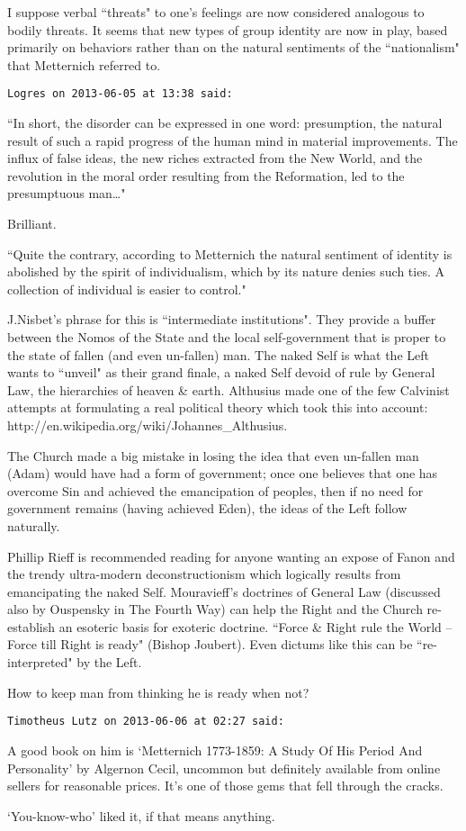 \begin{footnotesize}
\begin{sffamily}
I suppose verbal ``threats" to one's feelings are now considered analogous to bodily threats. It seems that new types of group identity are now in play, based primarily on behaviors rather than on the natural sentiments of the ``nationalism" that Metternich referred to.


\hfill

\texttt{Logres on 2013-06-05 at 13:38 said: }

``In short, the disorder can be expressed in one word: presumption, the natural result of such a rapid progress of the human mind in material improvements. The influx of false ideas, the new riches extracted from the New World, and the revolution in the moral order resulting from the Reformation, led to the presumptuous man…"

Brilliant. 

``Quite the contrary, according to Metternich the natural sentiment of identity is abolished by the spirit of individualism, which by its nature denies such ties. A collection of individual is easier to control."

J.Nisbet's phrase for this is ``intermediate institutions". They provide a buffer between the Nomos of the State and the local self-government that is proper to the state of fallen (and even un-fallen) man. The naked Self is what the Left wants to ``unveil" as their grand finale, a naked Self devoid of rule by General Law, the hierarchies of heaven \& earth. Althusius made one of the few Calvinist attempts at formulating a real political theory which took this into account: http://en.wikipedia.org/wiki/Johannes\_Althusius.

The Church made a big mistake in losing the idea that even un-fallen man (Adam) would have had a form of government; once one believes that one has overcome Sin and achieved the emancipation of peoples, then if no need for government remains (having achieved Eden), the ideas of the Left follow naturally. 

Phillip Rieff is recommended reading for anyone wanting an expose of Fanon and the trendy ultra-modern deconstructionism which logically results from emancipating the naked Self. Mouravieff's doctrines of General Law (discussed also by Ouspensky in The Fourth Way) can help the Right and the Church re-establish an esoteric basis for exoteric doctrine. ``Force \& Right rule the World – Force till Right is ready" (Bishop Joubert). Even dictums like this can be ``re-interpreted" by the Left. 

How to keep man from thinking he is ready when not?


\hfill

\texttt{Timotheus Lutz on 2013-06-06 at 02:27 said: }

A good book on him is `Metternich 1773-1859: A Study Of His Period And Personality' by Algernon Cecil, uncommon but definitely available from online sellers for reasonable prices. It's one of those gems that fell through the cracks.

`You-know-who' liked it, if that means anything.


\end{sffamily}\end{footnotesize}
